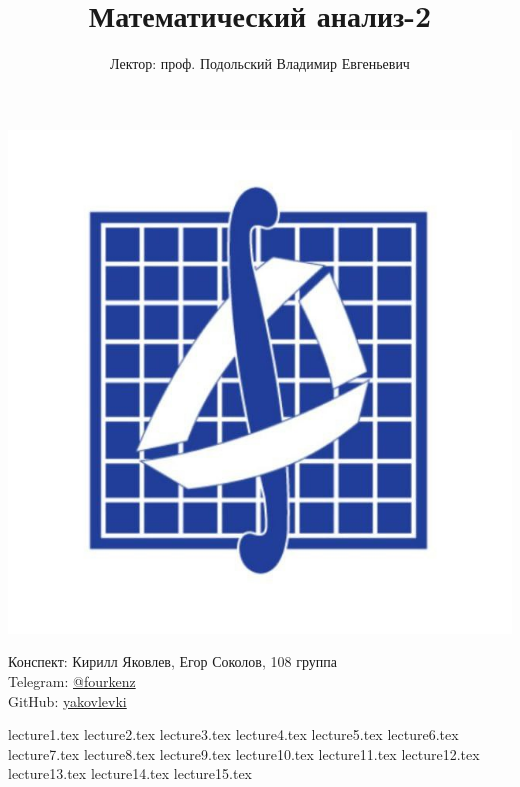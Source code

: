 \documentclass[a4paper, 12pt]{article}
\title{\textbf{Математический анализ-2}}
\author{Лектор: проф. Подольский Владимир Евгеньевич}
\begin{document}
    
\fontsize{14pt}{20pt}\selectfont
\maketitle
\vspace{0.3cm}
\begin{center}
    \includegraphics[width=0.75\linewidth]{Images/mehmat.png}
\end{center}
\vspace{1.5cm}
\begin{center}
    Конспект: Кирилл Яковлев, Егор Соколов, 108 группа\\
    Telegram: \href{https://t.me/fourkenz}{@fourkenz}\\
    GitHub: \href{https://github.com/yakovlevki}{yakovlevki}\\
\end{center}
    
\newpage
\tableofcontents
\newpage

{lecture1.tex}
{lecture2.tex}
{lecture3.tex}
{lecture4.tex}
{lecture5.tex}
{lecture6.tex}
{lecture7.tex}
{lecture8.tex}
{lecture9.tex}
{lecture10.tex}
{lecture11.tex}
{lecture12.tex}
{lecture13.tex}
{lecture14.tex}
{lecture15.tex}
\end{document}
